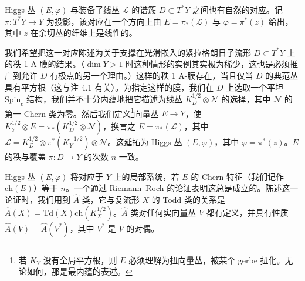 Higgs 丛 $(E,\varphi)$ 与装备了线丛 $\mathcal{L}$ 的谱簇 $D\subset T^*Y$ 之间也有自然的对应。记 $\pi:T^*Y\to Y$ 为投影，该对应在一个方向上由 $E=\pi_*(\mathcal{L})$ 与 $\varphi=\pi^*(z)$ 给出，其中 $z$ 在余切丛的纤维上是线性的。

我们希望把这一对应陈述为关于支撑在光滑嵌入的紧拉格朗日子流形 $D\subset T^*Y$ 上的秩 1 A-膜的结果。（$\dim Y>1$ 时这种情形的实例其实极为稀少，这也是必须推广到允许 $D$ 有极点的另一个理由。）这样的秩 1 A-膜存在，当且仅当 $D$ 的典范丛具有平方根（这与注 4.1 有关）。为指定这样的膜，我们在 $D$ 上选取一个平坦 $\mathrm{Spin}_c$ 结构，我们并不十分内蕴地把它描述为线丛 $K_D^{1/2}\otimes\mathcal{N}$ 的选择，其中 $\mathcal{N}$ 的第一 Chern 类为零。然后我们定义\footnote{若 $K_Y$ 没有全局平方根，则 $E$ 必须理解为扭向量丛，被某个 gerbe 扭化。无论如何，那是最内蕴的表述。}向量丛 $E\to Y$，使 $K_Y^{1/2}\otimes E=\pi_*(K_D^{1/2}\otimes\mathcal{N})$，换言之 $E=\pi_*(\mathcal{L})$，其中 $\mathcal{L}=K_D^{1/2}\otimes\pi^*(K_Y^{-1/2})\otimes\mathcal{N}$。这延拓为 Higgs 丛 $(E,\varphi)$，其中 $\varphi=\pi^*(z)$。$E$ 的秩与覆盖 $\pi:D\to Y$ 的次数 $n$ 一致。

Higgs 丛 $(E,\varphi)$ 将对应于 $Y$ 上的局部系统，若 $E$ 的 Chern 特征（我们记作 $\mathrm{ch}(E)$）等于 $n$。一个通过 Riemann--Roch 的论证表明这总是成立的。陈述这一论证时，我们用到 $\widehat{A}$ 类，它与复流形 $X$ 的 Todd 类的关系是 $\widehat{A}(X)=\mathrm{Td}(X)\mathrm{ch}(K_X^{1/2})$。$\widehat{A}$ 类对任何实向量丛 $V$ 都有定义，并具有性质 $\widehat{A}(V)=\widehat{A}(V^*)$，其中 $V^*$ 是 $V$ 的对偶。


